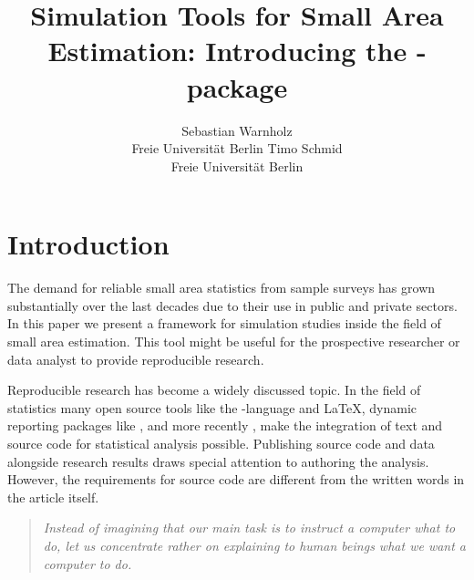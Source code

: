 \documentclass[article]{ajs}
\author{Sebastian Warnholz\\ Freie Universit\"at Berlin \And 
        Timo Schmid \\ Freie Universit\"at Berlin}
\title{Simulation Tools for Small Area Estimation: Introducing the \proglang{R}-package \proglang{saeSim}}
\newcommand{\red}[1]{\color{red} #1 \color{black} }
\begin{document}
%
%
%
\section{Introduction}
The demand for reliable small area statistics from sample surveys \red{has grown substantially} over the last decades due to their use in public and private sectors. In this paper we present a framework for simulation studies inside the field of small area estimation. This tool might be useful for the prospective researcher or data analyst to provide reproducible research.

Reproducible research has become a widely discussed topic. In the field of statistics many open source tools like the -language \citep{r14} and \LaTeX, dynamic reporting packages like  \citep{yihui13},  \citep{leisch02} and more recently  \citep{allaire14}, make the integration of text and source code for statistical analysis possible. Publishing source code and data alongside research results draws special attention to authoring the analysis. However, the requirements for source code are different from the written words in the article itself. 

\begin{quote}
\textit{Instead of imagining that our main task is to instruct a computer what to do, let us concentrate rather on explaining to human beings what we want a computer to do.} \cite[p.99]{knuth92} 
\end{quote} 
\end{document}
